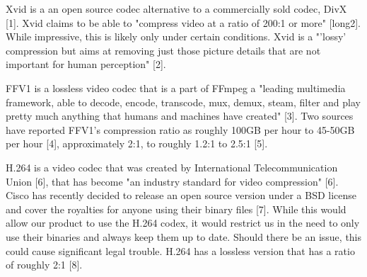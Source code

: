 \documentclass[letterpaper,10pt,onecolumn,draftclsnofoot]{IEEEtran}
\begin{document}
Xvid is a an open source codec alternative to a commercially sold codec, DivX [1].
Xvid claims to be able to "compress video at a ratio of 200:1 or more" [long2]. 
While impressive, this is likely only under certain conditions.
Xvid is a "'lossy' compression but aims at removing just those picture details that are not important for human perception" [2].

FFV1 is a lossless video codec that is a part of FFmpeg a "leading multimedia framework, able to decode, encode, transcode, mux, demux, steam, filter and play pretty much anything that humans and machines have created" [3].
Two sources have reported FFV1's compression ratio as roughly 100GB per hour to 45-50GB per hour [4],
approximately 2:1, to roughly 1.2:1 to 2.5:1 [5].

H.264 is a video codec that was created by International Telecommunication Union [6],
that has become "an industry standard for video compression" [6]. %
Cisco has recently decided to release an open source version under a BSD license and cover the royalties for anyone using their binary files [7].
While this would allow our product to use the H.264 codex, it would restrict us in the need to only use their binaries and always keep them up to date.
Should there be an issue, this could cause significant legal trouble.
H.264 has a lossless version that has a ratio of roughly 2:1 [8].
\end{document}
